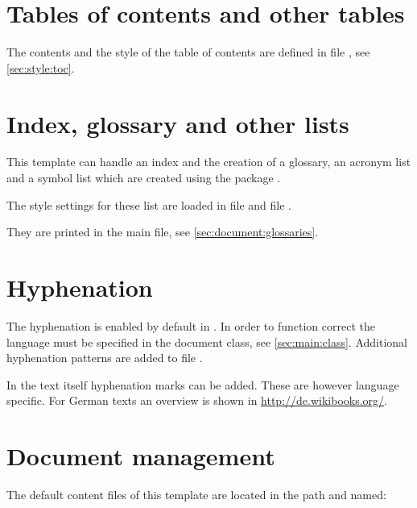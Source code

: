 \section{Tables of contents and other tables}
\label{sec:doc:faq:toc}

The contents and the style of the table of contents are defined in file , see \cref{sec:style:toc}.

\section{Index, glossary and other lists}
\label{sec:doc:faq:index}

This template can handle an index and the creation of a glossary, an acronym list and a symbol list which are created using the package .

The style settings for these list are loaded in file  and file .

They are printed in the main file, see \cref{sec:document:glossaries}.

\section{Hyphenation}
\label{sec:doc:faq:hyphenation}

The hyphenation is enabled by default in \latex. In order to function correct the language must be specified in the document class, see \cref{sec:main:class}. Additional hyphenation patterns are added to file .

In the text itself hyphenation marks can be added. These are however language specific. For German texts an overview is shown in \href{http://de.wikibooks.org/wiki/LaTeX-Wörterbuch:_Silbentrennung}{http://de.wikibooks.org/}.

\section{Document management}
\label{sec:doc:faq:documents}

The default content files of this template are located in the path  and named:


